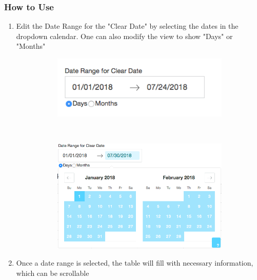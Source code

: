 \documentclass[titlepage]{article}
\begin{document}
\subsubsection{How to Use}
\begin{enumerate}
	\item Edit the Date Range for the "Clear Date" by selecting the dates in the dropdown calendar. One can also modify the view to show "Days" or "Months"
	\begin{figure}[h]
		\begin{subfigure}[b]{.5\textwidth}
			\includegraphics[scale=.5]{./pics/bank_reconcillation_dateRange.png}
		\end{subfigure}
		~
		\begin{subfigure}[b]{0.5\textwidth}
			\includegraphics[scale=.3]{./pics/bank_reconcillation_dateRange_dropdown.png}
		\end{subfigure}
	\end{figure}
	\item Once a date range is selected, the table will fill with necessary information, which can be scrollable
\end{enumerate} 
\end{document}
